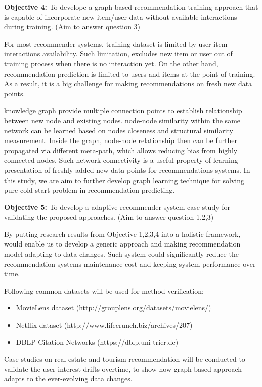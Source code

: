 \bigskip
\textbf{Objective 4:} To develope a graph based recommendation training approach that is capable of incorporate new item/user data without available interactions during training. (Aim to answer question 3)

For most recommender systems, training dataset is limited by user-item interactions availability. Such limitation, excludes new item or user out of training process when there is no interaction yet. On the other hand, recommendation prediction is limited to users and items at the point of training. As a result, it is a big challenge for making recommendations on fresh new data points. 

knowledge graph provide multiple connection points to establish relationship between new node and existing nodes. node-node similarity within the same network can be learned based on nodes closeness and structural similarity measurement. Inside the graph, node-node relationship then can be further propagated via different meta-path, which allows reducing bias from highly connected nodes. Such network connectivity is a useful property of learning presentation of freshly added new data points for recommendations systems. In this study, we are aim to further develop graph learning technique for solving pure cold start problem in recommendation predicting.

\bigskip
\textbf{Objective 5:} To develop a adaptive recommender system case study for validating the proposed approaches. (Aim to answer question 1,2,3)

By putting research results from Objective 1,2,3,4 into a holistic framework, would enable us to develop a generic approach and making recommendation model adapting to data changes. Such system could significantly reduce the recommendation systems maintenance cost and keeping system performance over time. 

Following common datasets will be used for method verification: 

\begin{itemize}

\item MovieLens dataset (http://grouplens.org/datasets/movielens/) 

\item Netflix dataset (http://www.lifecrunch.biz/archives/207) 

\item DBLP Citation Networks (https://dblp.uni-trier.de)  

\end{itemize}

Case studies on real estate and tourism recommendation will be conducted to validate the user-interest drifts overtime, to show how graph-based approach adapts to the ever-evolving data changes. 
